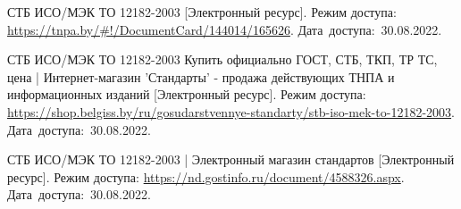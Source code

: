 \begin{thebibliography}{}
  
  
    СТБ ИСО/МЭК ТО 12182-2003
    [Электронный ресурс].
    Режим доступа: \url{https://tnpa.by/#!/DocumentCard/144014/165626}.
    Дата~доступа:~30.08.2022.
  
    СТБ ИСО/МЭК ТО 12182-2003 Купить официально ГОСТ, СТБ, ТКП, ТР ТС, цена | Интернет-магазин 'Стандарты' - продажа действующих ТНПА и информационных изданий
    [Электронный ресурс].
    Режим доступа: \url{https://shop.belgiss.by/ru/gosudarstvennye-standarty/stb-iso-mek-to-12182-2003}.
    Дата~доступа:~30.08.2022.
  
    СТБ ИСО/МЭК ТО 12182-2003 | Электронный магазин стандартов
    [Электронный ресурс].
    Режим доступа: \url{https://nd.gostinfo.ru/document/4588326.aspx}.
    Дата~доступа:~30.08.2022.
  \end{thebibliography}
\endgroup
\newpage
